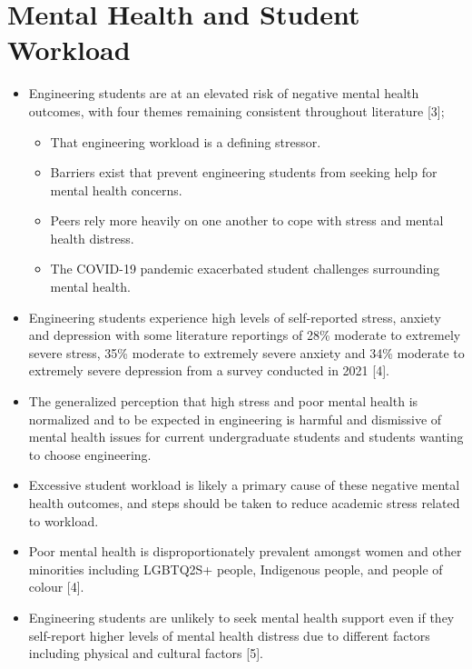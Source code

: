\section{Mental Health and Student Workload}\label{mental-health-and-student-workload}



\begin{itemize}
 \item Engineering students are at an elevated risk of negative mental health outcomes, with four themes remaining consistent throughout literature [3];
 \begin{itemize}
  \item That engineering workload is a defining stressor.
  \item Barriers exist that prevent engineering students from seeking help for mental health concerns.
  \item Peers rely more heavily on one another to cope with stress and mental health distress.
  \item The COVID-19 pandemic exacerbated student challenges surrounding mental health.
 \end{itemize}
 \item Engineering students experience high levels of self-reported stress, anxiety and depression with some literature reportings of 28\% moderate to extremely severe stress, 35\% moderate to extremely severe anxiety and 34\% moderate to extremely severe depression from a survey conducted in 2021 [4].
 \item The generalized perception that high stress and poor mental health is normalized and to be expected in engineering is harmful and dismissive of mental health issues for current undergraduate students and students wanting to choose engineering.
 \item Excessive student workload is likely a primary cause of these negative mental health outcomes, and steps should be taken to reduce academic stress related to workload.
 \item Poor mental health is disproportionately prevalent amongst women and other minorities including LGBTQ2S+ people, Indigenous people, and people of colour [4].
 \item Engineering students are unlikely to seek mental health support even if they self-report higher levels of mental health distress due to different factors including physical and cultural factors [5].
\end{itemize}

